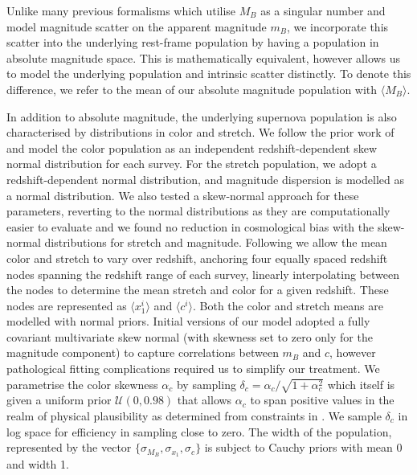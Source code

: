 \documentclass[a4paper,fleqn,usenatbib,manuscript]{emulateapj}
\newcommand{\blue}{\color{blue}}
\newcommand{\rubin}{\citetalias{Rubin2015}}
\begin{document}
Unlike many previous formalisms which utilise $M_B$ as a singular number and model magnitude scatter on the apparent magnitude $m_B$, we incorporate this scatter into the underlying rest-frame population by having a population in absolute magnitude space. {\blue This is mathematically equivalent, however allows us to model the underlying population and intrinsic scatter distinctly.} To denote this difference, we refer to the mean of our absolute magnitude population with $\langle M_B \rangle$.

In addition to absolute magnitude, the underlying supernova population is also characterised by distributions in color and stretch. We follow the prior work of {\rubin} and model the color population as an independent redshift-dependent skew normal distribution for each survey. For the stretch population, we adopt a redshift-dependent normal distribution, and magnitude dispersion is modelled as a normal distribution. We also tested a skew-normal approach for these parameters, reverting to the normal distributions as they are computationally easier to evaluate and we found no reduction in cosmological bias with the skew-normal distributions for stretch and magnitude. Following {\rubin} we allow the mean color and stretch to vary over redshift, anchoring four equally spaced redshift nodes spanning the redshift range of each survey, linearly interpolating between the nodes to determine the mean stretch and color for a given redshift. These nodes are represented as $\langle x_1^i \rangle$ and $\langle c^i \rangle$. Both the color and stretch means are modelled with normal priors. Initial versions of our model adopted a fully covariant multivariate skew normal (with skewness set to zero only for the magnitude component) to capture correlations between $m_B$ and $c$, however pathological fitting complications required us to simplify our treatment. We parametrise the color skewness $\alpha_c$ by sampling $\delta_c = \alpha_c / \sqrt{1 + \alpha_c^2}$ which itself is given a uniform prior $\mathcal{U}(0,0.98)$ that allows $\alpha_c$ to span positive values in the realm of physical plausibility as determined from constraints in \citet{Scolnic2016}. We sample $\delta_c$ in log space for efficiency in sampling close to zero. The width of the population, represented by the vector $\lbrace \sigma_{M_B}, \sigma_{x_1}, \sigma_c \rbrace$ is subject to Cauchy priors with {\blue mean 0 and width 1}. 
\end{document}
